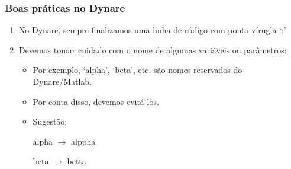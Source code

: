 \documentclass[xcolor=pdftex,dvipsnames,table]{beamer}
\newcommand{\ft}{\frametitle}
\begin{document}
\begin{frame}
\ft{Boas práticas no Dynare}

\begin{enumerate}
\item No Dynare, sempre finalizamos uma linha de código com ponto-vírugla `;'

\item Devemos tomar cuidado com o nome de algumas variáveis ou parâmetros:

	\begin{itemize}
	\item Por exemplo, `alpha', `beta', etc. são nomes reservados do Dynare/Matlab.
	
	\item Por conta disso, devemos evitá-los.
	
	\item Sugestão: 
	
	alpha $\longrightarrow$ alppha
	
	beta  $\longrightarrow$ betta
	
	\end{itemize}

\end{enumerate}
\end{frame}

\end{document}
